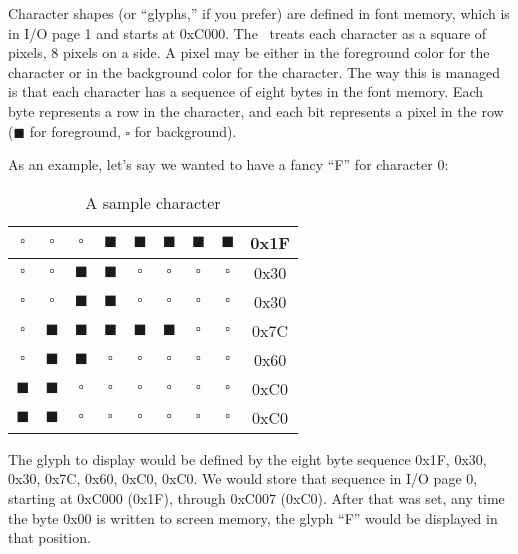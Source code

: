 Character shapes (or ``glyphs,'' if you prefer) are defined in font memory, which is in I/O page 1 and starts at 0xC000. The \jr\ treats each character as a square of pixels, 8 pixels on a side. A pixel may be either in the foreground color for the character or in the background color for the character. The way this is managed is that each character has a sequence of eight bytes in the font memory. Each byte represents a row in the character, and each bit represents a pixel in the row ($\blacksquare$ for foreground, $\square$ for background).

As an example, let's say we wanted to have a fancy ``F'' for character 0:

\begin{table}[ht]
    \begin{center}
        \begin{tabular}{|c|c|c|c|c|c|c|c|c|} \hline
            $\square$ & $\square$ & $\square$ & $\blacksquare$ & $\blacksquare$ & $\blacksquare$ & $\blacksquare$ & $\blacksquare$ & 0x1F \\ \hline
            $\square$ & $\square$ & $\blacksquare$ & $\blacksquare$ & $\square$ & $\square$ & $\square$ & $\square$ & 0x30 \\ \hline
            $\square$ & $\square$ & $\blacksquare$ & $\blacksquare$ & $\square$ & $\square$ & $\square$ & $\square$ & 0x30 \\ \hline
            $\square$ & $\blacksquare$ & $\blacksquare$ & $\blacksquare$ & $\blacksquare$ & $\blacksquare$ & $\square$ & $\square$ & 0x7C \\ \hline
            $\square$ & $\blacksquare$ & $\blacksquare$ & $\square$ & $\square$ & $\square$ & $\square$ & $\square$ & 0x60 \\ \hline
            $\blacksquare$ & $\blacksquare$ & $\square$ & $\square$ & $\square$ & $\square$ & $\square$ & $\square$ & 0xC0 \\ \hline
            $\blacksquare$ & $\blacksquare$ & $\square$ & $\square$ & $\square$ & $\square$ & $\square$ & $\square$ & 0xC0 \\ \hline
        \end{tabular}
    \end{center}
    \caption{A sample character}
    \label{tab:text_font}
\end{table}

The glyph to display would be defined by the eight byte sequence 0x1F, 0x30, 0x30, 0x7C, 0x60, 0xC0, 0xC0. We would store that sequence in I/O page 0, starting at 0xC000 (0x1F), through 0xC007 (0xC0). After that was set, any time the byte 0x00 is written to screen memory, the glyph ``F'' would be displayed in that position.

